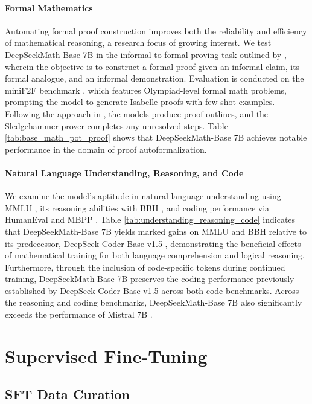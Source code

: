 \paragraph{Formal Mathematics}

Automating formal proof construction improves both the reliability and efficiency of mathematical reasoning, a research focus of growing interest. We test DeepSeekMath-Base 7B in the informal-to-formal proving task outlined by \citep{dsp_proof}, wherein the objective is to construct a formal proof given an informal claim, its formal analogue, and an informal demonstration. Evaluation is conducted on the miniF2F benchmark \citep{minif2f}, which features Olympiad-level formal math problems, prompting the model to generate Isabelle proofs with few-shot examples. Following the approach in \cite{dsp_proof}, the models produce proof outlines, and the Sledgehammer \citep{sledgehammer} prover completes any unresolved steps. Table \ref{tab:base_math_pot_proof} shows that DeepSeekMath-Base 7B achieves notable performance in the domain of proof autoformalization.

\paragraph{Natural Language Understanding, Reasoning, and Code}

We examine the model’s aptitude in natural language understanding using MMLU \citep{mmlu}, its reasoning abilities with BBH \citep{bbh}, and coding performance via HumanEval \citep{codex} and MBPP \citep{mbpp}. Table \ref{tab:understanding_reasoning_code} indicates that DeepSeekMath-Base 7B yields marked gains on MMLU and BBH relative to its predecessor, DeepSeek-Coder-Base-v1.5 \citep{deepseek-coder}, demonstrating the beneficial effects of mathematical training for both language comprehension and logical reasoning. Furthermore, through the inclusion of code-specific tokens during continued training, DeepSeekMath-Base 7B preserves the coding performance previously established by DeepSeek-Coder-Base-v1.5 across both code benchmarks. Across the reasoning and coding benchmarks, DeepSeekMath-Base 7B also significantly exceeds the performance of Mistral 7B \citep{mistral}.

\section{Supervised Fine-Tuning}

\subsection{SFT Data Curation}

